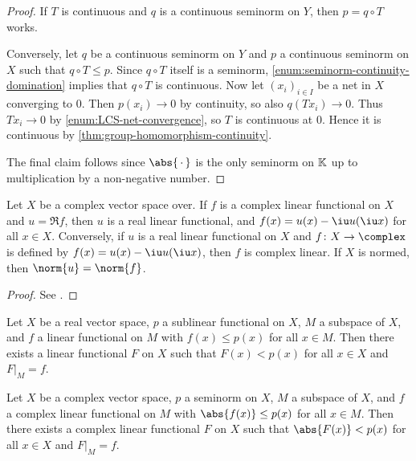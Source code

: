 \documentclass[article, a4paper, 11pt, oneside]{memoir}
\numberwithin{equation}{chapter}
\begin{document}
\begin{proof}
    If $T$ is continuous and $q$ is a continuous seminorm on $Y$, then $p = q \circ T$ works.

    Conversely, let $q$ be a continuous seminorm on $Y$ and $p$ a continuous seminorm on $X$ such that $q \circ T \leq p$. Since $q \circ T$ itself is a seminorm, \cref{enum:seminorm-continuity-domination} implies that $q \circ T$ is continuous. Now let $(x_i)_{i \in I}$ be a net in $X$ converging to $0$. Then $p(x_i) \to 0$ by continuity, so also $q(Tx_i) \to 0$. Thus $Tx_i \to 0$ by \cref{enum:LCS-net-convergence}, so $T$ is continuous at $0$. Hence it is continuous by \cref{thm:group-homomorphism-continuity}.

    The final claim follows since $\abs{\,\cdot\,}$ is the only seminorm on $\mathbb{K}$ up to multiplication by a non-negative number.
\end{proof}


\begin{lemma}
    \label{thm:real-complex-functionals}
    Let $X$ be a complex vector space over. If $f$ is a complex linear functional on $X$ and $u = \Re f$, then $u$ is a real linear functional, and $f(x) = u(x) - \iu u(\iu x)$ for all $x \in X$. Conversely,  if $u$ is a real linear functional on $X$ and $f \colon X \to \complex$ is defined by $f(x) = u(x) - \iu u(\iu x)$, then $f$ is complex linear. If $X$ is normed, then $\norm{u} = \norm{f}$.
\end{lemma}

\begin{proof}
    See \textcite[Proposition~5.5]{folland2007}.
\end{proof}


\begin{theorem}
    \label{thm:Hahn-Banach-extension}
    \begin{enumthm}
        \item \label{enum:Hahn-Banach-extension-real} Let $X$ be a real vector space, $p$ a sublinear functional on $X$, $M$ a subspace of $X$, and $f$ a linear functional on $M$ with $f(x) \leq p(x)$ for all $x \in M$. Then there exists a linear functional $F$ on $X$ such that $F(x) < p(x)$ for all $x \in X$ and $F|_M = f$.
        
        \item Let $X$ be a complex vector space, $p$ a seminorm on $X$, $M$ a subspace of $X$, and $f$ a complex linear functional on $M$ with $\abs{f(x)} \leq p(x)$ for all $x \in M$. Then there exists a complex linear functional $F$ on $X$ such that $\abs{F(x)} < p(x)$ for all $x \in X$ and $F|_M = f$.
    \end{enumthm}
\end{theorem}
\end{document}
